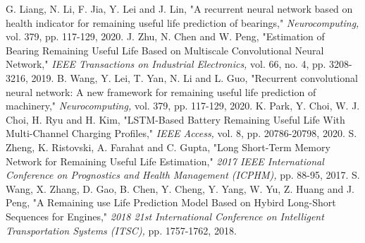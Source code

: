 \documentclass[journal]{IEEEtran}
\begin{document}
\begin{thebibliography}{10}
G. Liang, N. Li, F. Jia, Y. Lei and J. Lin, "A recurrent neural network based on health indicator for remaining useful life prediction of bearings," \emph{Neurocomputing,} vol. 379, pp. 117-129, 2020. 
J. Zhu, N. Chen and W. Peng, "Estimation of Bearing Remaining Useful Life Based on Multiscale Convolutional Neural Network," \emph{IEEE Transactions on Industrial Electronics, }vol. 66, no. 4, pp. 3208-3216, 2019. 
B. Wang, Y. Lei, T. Yan, N. Li and L. Guo, "Recurrent convolutional neural network: A new framework for remaining useful life prediction of machinery," \emph{Neurocomputing, }vol. 379, pp. 117-129, 2020. 
K. Park, Y. Choi, W. J. Choi, H. Ryu and H. Kim, "LSTM-Based Battery Remaining Useful Life With Multi-Channel Charging Profiles," \emph{IEEE Access, }vol. 8, pp. 20786-20798, 2020. 
S. Zheng, K. Ristovski, A. Farahat and C. Gupta, "Long Short-Term Memory Network for Remaining Useful Life Estimation," \emph{2017 IEEE International Conference on Prognostics and Health Management (ICPHM), }pp. 88-95, 2017. 
S. Wang, X. Zhang, D. Gao, B. Chen, Y. Cheng, Y. Yang, W. Yu, Z. Huang and J. Peng, "A Remaining use Life Prediction Model Based on Hybird Long-Short Sequences for Engines," \emph{2018 21st International Conference on Intelligent Transportation Systems (ITSC), }  pp. 1757-1762, 2018. 


\end{thebibliography}
\end{document}
